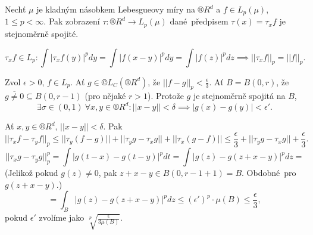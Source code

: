 \documentclass[12pt]{article}					%
\begin{document}
\begin{veta}
	Nechť $\mu$ je kladným násobkem Lebesgueovy míry na $®R^d$ a $f \in L_p(\mu)$, $1 ≤ p < ∞$. Pak zobrazení $\tau: ®R^d \rightarrow L_p(\mu)$ dané předpisem $\tau(x) = \tau_x f$ je stejnoměrně spojité.

	\begin{dukazin}
		$$ \tau_x f \in L_p: \int |\tau_x f(y)|^p dy = \int |f(x - y)|^p dy = \int |f(z)|^p dz \implies ||\tau_x f||_p = ||f||_p. $$

		Zvol $\epsilon > 0$, $f \in L_p$. Ať $g \in ©L_C (®R^d)$, že $||f - g||_p < \frac{\epsilon}{3}$. Ať $B = B(0, r)$, že $\overline{g ≠ 0} \subseteq B(0, r - 1)$ (pro nějaké $r > 1$). Protože $g$ je stejnoměrně spojitá na $B$,
		$$ \exists \sigma \in (0, 1)\ \forall x, y \in ®R^d: ||x - y|| < \delta \implies |g(x) - g(y)| < \epsilon'. $$

		Ať $x, y \in ®R^d$, $||x - y|| < \delta$. Pak
		$$ ||\tau_x f - \tau_y f||_p ≤ ||\tau_y (f - g)|| + ||\tau_y g - \tau_x g|| + ||\tau_x(g - f)|| ≤ \frac{\epsilon}{3} + ||\tau_y g - \tau_x g|| + \frac{\epsilon}{3}. $$
		$$ ||\tau_x g - \tau_y g||_p^p = \int |g(t - x) - g(t - y)|^p dt = \int |g(z) - g(z + x - y)|^p dz = $$
		(Jelikož pokud $g(z) ≠ 0$, pak $z + x - y \in B(0, r - 1 + 1) = B$. Obdobné pro $g(z + x - y)$.)
		$$ = \int_B |g(z) - g(z + x - y)|^p dz ≤ (\epsilon')^p·\mu(B) ≤ \frac{\epsilon}{3}, $$
		pokud $\epsilon'$ zvolíme jako $\sqrt[p]{\frac{\epsilon}{3\mu(B)}}$.
	\end{dukazin}
\end{veta}
\end{document}
